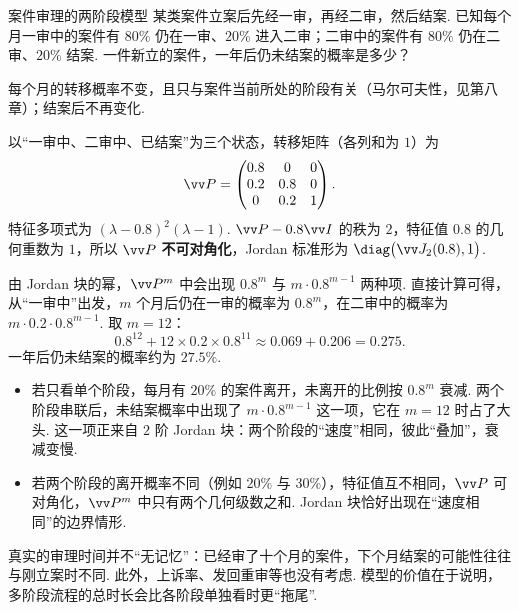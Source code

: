 	\begin{modelbox}{案件审理的两阶段模型}
		 某类案件立案后先经一审，再经二审，然后结案. 已知每个月一审中的案件有 $80\%$ 仍在一审、$20\%$ 进入二审；二审中的案件有 $80\%$ 仍在二审、$20\%$ 结案. 一件新立的案件，一年后仍未结案的概率是多少？
		
		 每个月的转移概率不变，且只与案件当前所处的阶段有关（马尔可夫性，见第八章）；结案后不再变化.
		
		 以“一审中、二审中、已结案”为三个状态，转移矩阵（各列和为 $1$）为
		\[\vv P=\begin{pmatrix}0.8&0&0\\0.2&0.8&0\\0&0.2&1\end{pmatrix}.\]
		特征多项式为 $(\lambda-0.8)^2(\lambda-1)$. $\vv P-0.8\vv I$ 的秩为 $2$，特征值 $0.8$ 的几何重数为 $1$，所以 $\vv P$ \textbf{不可对角化}，Jordan 标准形为 $\diag\big(\vv J_2(0.8),1\big)$.
		
		 由 Jordan 块的幂，$\vv P^m$ 中会出现 $0.8^m$ 与 $m\cdot0.8^{m-1}$ 两种项. 直接计算可得，从“一审中”出发，$m$ 个月后仍在一审的概率为 $0.8^m$，在二审中的概率为 $m\cdot0.2\cdot0.8^{m-1}$. 取 $m=12$：
		\[0.8^{12}+12\times0.2\times0.8^{11}\approx0.069+0.206=0.275.\]
		一年后仍未结案的概率约为 $27.5\%$.
		
		\begin{itemize}
			\item 若只看单个阶段，每月有 $20\%$ 的案件离开，未离开的比例按 $0.8^m$ 衰减. 两个阶段串联后，未结案概率中出现了 $m\cdot0.8^{m-1}$ 这一项，它在 $m=12$ 时占了大头. 这一项正来自 $2$ 阶 Jordan 块：两个阶段的“速度”相同，彼此“叠加”，衰减变慢.
			\item 若两个阶段的离开概率不同（例如 $20\%$ 与 $30\%$），特征值互不相同，$\vv P$ 可对角化，$\vv P^m$ 中只有两个几何级数之和. Jordan 块恰好出现在“速度相同”的边界情形.
		\end{itemize}
		
		 真实的审理时间并不“无记忆”：已经审了十个月的案件，下个月结案的可能性往往与刚立案时不同. 此外，上诉率、发回重审等也没有考虑. 模型的价值在于说明，多阶段流程的总时长会比各阶段单独看时更“拖尾”.
	\end{modelbox}
	
